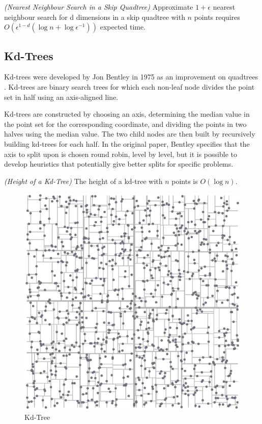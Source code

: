 \documentclass[mcs]{scsthesis}
\begin{document}
\begin{thm} \emph{(Nearest Neighbour Search in a Skip Quadtree)} 
Approximate \(1 + \epsilon\) nearest neighbour search for d dimensions in a skip
quadtree with $n$ points requires
\(O(\epsilon^{1 - d}(\log n + \log \epsilon^{-1}))\) expected time.
\end{thm}

\subsection{Kd-Trees}

Kd-trees were developed by Jon Bentley in 1975 as an improvement on quadtrees
\cite{kdtree}. Kd-trees are binary search trees for which each non-leaf node
divides the point set in half using an axis-aligned line.

Kd-trees are constructed by choosing an axis, determining the median value in
the point set for the corresponding coordinate, and dividing the points in two
halves using the median value. The two child nodes are then built by
recursively building kd-trees for each half. In the original paper, Bentley
specifies that the axis to split upon is chosen round robin, level by level,
but it is possible to develop heuristics that potentially give better splits
for specific problems.

\begin{thm} \emph{(Height of a Kd-Tree)}
The height of a kd-tree with $n$ points is \(O(\log n)\).
\end{thm}

\begin{figure}
\begin{center}
\includegraphics[scale=0.35]{diagrams/kdtree.eps}
\caption{Kd-Tree}
\label{fig:kd_tree}
\end{center}
\end{figure}
\end{document}
